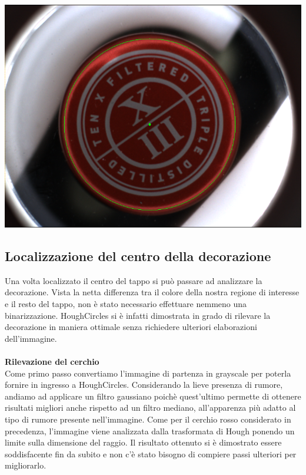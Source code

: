 \vspace{1cm}

\begin{centering}
\includegraphics[width=\textwidth]{img/finale1.png}
\end{centering}

\newpage

\subsection{Localizzazione del centro della decorazione}

Una volta localizzato il centro del tappo si può passare ad analizzare la decorazione. Vista la netta differenza tra il colore della nostra regione di interesse e il resto del tappo, non è stato necessario effettuare nemmeno una binarizzazione. HoughCircles si è infatti dimostrata in grado di rilevare la decorazione in maniera ottimale senza richiedere ulteriori elaborazioni dell'immagine.
\\
\\
\noindent
\textbf{Rilevazione del cerchio}
\\ 	
Come primo passo convertiamo l'immagine di partenza in grayscale per poterla fornire in ingresso a HoughCircles. Considerando la lieve presenza di rumore, andiamo ad applicare un filtro gaussiano poichè quest'ultimo permette di ottenere risultati migliori anche rispetto ad un filtro mediano, all'apparenza più adatto al tipo di rumore presente nell'immagine.	
Come per il cerchio rosso considerato in precedenza, l’immagine viene analizzata dalla trasformata di Hough ponendo un limite sulla dimensione del raggio. Il risultato ottenuto si è dimostrato essere soddisfacente fin da subito e non c’è stato bisogno di compiere passi ulteriori per migliorarlo.

